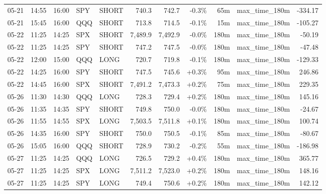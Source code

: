 \documentclass[11pt,a4paper,twoside]{article}
\begin{document}
\begin{center}
\begin{longtable}{>{\color{txtmain}}l l l l l r r r r >{\color{txtmain}}l r}
05-21 & 14:55 & 16:00 & SPY & SHORT & 740.3 & 742.7 & \textcolor{lossred}{-0.3\%} & 65m & max\_time\_180m & \textcolor{lossred}{-334.17} \\
05-21 & 15:45 & 16:00 & QQQ & SHORT & 713.8 & 714.5 & \textcolor{lossred}{-0.1\%} & 15m & max\_time\_180m & \textcolor{lossred}{-105.27} \\
05-22 & 11:25 & 14:25 & SPX & SHORT & 7,489.9 & 7,492.9 & \textcolor{lossred}{-0.0\%} & 180m & max\_time\_180m & \textcolor{lossred}{-50.19} \\
05-22 & 11:25 & 14:25 & SPY & SHORT & 747.2 & 747.5 & \textcolor{lossred}{-0.0\%} & 180m & max\_time\_180m & \textcolor{lossred}{-47.48} \\
05-22 & 12:00 & 15:00 & QQQ & LONG & 720.7 & 719.8 & \textcolor{lossred}{-0.1\%} & 180m & max\_time\_180m & \textcolor{lossred}{-129.33} \\
05-22 & 14:25 & 16:00 & SPY & SHORT & 747.5 & 745.6 & \textcolor{wingreen}{+0.3\%} & 95m & max\_time\_180m & \textcolor{wingreen}{246.86} \\
05-22 & 14:45 & 16:00 & SPX & SHORT & 7,491.2 & 7,473.3 & \textcolor{wingreen}{+0.2\%} & 75m & max\_time\_180m & \textcolor{wingreen}{229.35} \\
05-26 & 11:30 & 14:30 & QQQ & LONG & 728.3 & 729.4 & \textcolor{wingreen}{+0.2\%} & 180m & max\_time\_180m & \textcolor{wingreen}{145.16} \\
05-26 & 11:35 & 14:35 & SPY & SHORT & 749.8 & 750.0 & \textcolor{lossred}{-0.0\%} & 180m & max\_time\_180m & \textcolor{lossred}{-24.67} \\
05-26 & 11:55 & 14:55 & SPX & LONG & 7,503.5 & 7,511.8 & \textcolor{wingreen}{+0.1\%} & 180m & max\_time\_180m & \textcolor{wingreen}{100.74} \\
05-26 & 14:35 & 16:00 & SPY & SHORT & 750.0 & 750.5 & \textcolor{lossred}{-0.1\%} & 85m & max\_time\_180m & \textcolor{lossred}{-80.67} \\
05-26 & 15:05 & 16:00 & QQQ & SHORT & 728.9 & 730.2 & \textcolor{lossred}{-0.2\%} & 55m & max\_time\_180m & \textcolor{lossred}{-186.98} \\
05-27 & 11:25 & 14:25 & QQQ & LONG & 726.5 & 729.2 & \textcolor{wingreen}{+0.4\%} & 180m & max\_time\_180m & \textcolor{wingreen}{365.77} \\
05-27 & 11:25 & 14:25 & SPX & LONG & 7,511.2 & 7,523.0 & \textcolor{wingreen}{+0.2\%} & 180m & max\_time\_180m & \textcolor{wingreen}{148.16} \\
05-27 & 11:25 & 14:25 & SPY & LONG & 749.4 & 750.6 & \textcolor{wingreen}{+0.2\%} & 180m & max\_time\_180m & \textcolor{wingreen}{142.12} \\

\end{longtable}
\end{center}
\end{document}
